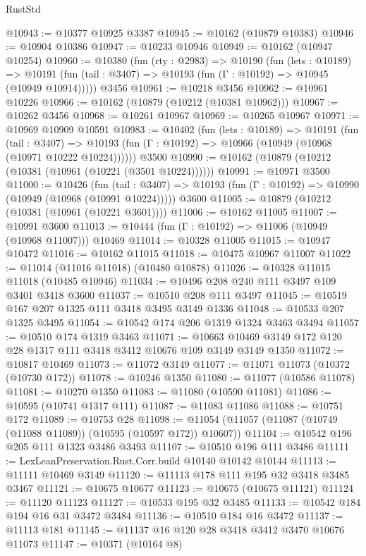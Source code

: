\begin{lexlean}{RustStd}
\begin{coremodule}
@10943 := @10377 @10925 @3387
@10945 := @10162 (@10879 @10383)
@10946 := @10904 @10386
@10947 := @10233 @10946
@10949 := @10162 (@10947 @10254)
@10960 := @10380
    (fun (rty : @2983) =>
    @10190
      (fun (lets : @10189) =>
      @10191 (fun (tail : @3407) => @10193 (fun (Γ : @10192) => @10945 (@10949 @10914)))))
    @3456
@10961 := @10218 @3456
@10962 := @10961 @10226
@10966 := @10162 (@10879 (@10212 (@10381 @10962)))
@10967 := @10262 @3456
@10968 := @10261 @10967
@10969 := @10265 @10967
@10971 := @10969 @10909 @10591
@10983 := @10402
    (fun (lets : @10189) =>
    @10191
      (fun (tail : @3407) =>
      @10193 (fun (Γ : @10192) => @10966 (@10949 (@10968 (@10971 @10222 @10224))))))
    @3500
@10990 := @10162 (@10879 (@10212 (@10381 (@10961 (@10221 (@3501 @10224))))))
@10991 := @10971 @3500
@11000 := @10426
    (fun (tail : @3407) => @10193 (fun (Γ : @10192) => @10990 (@10949 (@10968 (@10991 @10224)))))
    @3600
@11005 := @10879 (@10212 (@10381 (@10961 (@10221 @3601))))
@11006 := @10162 @11005
@11007 := @10991 @3600
@11013 := @10444 (fun (Γ : @10192) => @11006 (@10949 (@10968 @11007))) @10469
@11014 := @10328 @11005
@11015 := @10947 @10472
@11016 := @10162 @11015
@11018 := @10475 @10967 @11007
@11022 := @11014 (@11016 @11018) (@10480 @10878)
@11026 := @10328 @11015 @11018 (@10485 @10946)
@11034 := @10496 @208 @240 @111 @3497 @109 @3401 @3418 @3600
@11037 := @10510 @208 @111 @3497
@11045 := @10519 @167 @207 @1325 @111 @3418 @3495 @3149 @1336
@11048 := @10533 @207 @1325 @3495
@11054 := @10542 @174 @206 @1319 @1324 @3463 @3494
@11057 := @10510 @174 @1319 @3463
@11071 := @10663 @10469 @3149 @172 @120 @28 @1317 @111 @3418 @3412 @10676 @109 @3149 @3149 @1350
@11072 := @10817 @10469
@11073 := @11072 @3149
@11077 := @11071 @11073 (@10372 (@10730 @172))
@11078 := @10246 @1350
@11080 := @11077 (@10586 @11078)
@11081 := @10270 @1350
@11083 := @11080 (@10590 @11081)
@11086 := @10595 (@10741 @1317 @111)
@11087 := @11083 @11086
@11088 := @10751 @172
@11089 := @10753 @28
@11098 := @11054 (@11057 (@11087 (@10749 (@11088 @11089)) (@10595 (@10597 @172)) @10607))
@11104 := @10542 @196 @205 @111 @1323 @3486 @3493
@11107 := @10510 @196 @111 @3486
@11111 := LexLeanPreservation.Rust.Corr.build @10140 @10142 @10144
@11113 := @11111 @10469 @3149
@11120 := @11113 @178 @111 @195 @32 @3418 @3485 @3467
@11121 := @10675 @10677
@11123 := @10675 (@10675 @11121)
@11124 := @11120 @11123
@11127 := @10533 @195 @32 @3485
@11133 := @10542 @184 @194 @16 @31 @3472 @3484
@11136 := @10510 @184 @16 @3472
@11137 := @11113 @181
@11145 := @11137 @16 @120 @28 @3418 @3412 @3470 @10676 @11073
@11147 := @10371 (@10164 @8)

\end{coremodule}
\end{lexlean}
